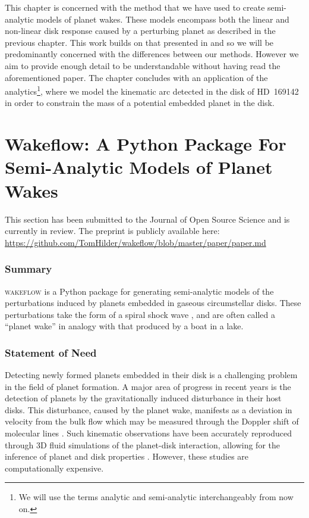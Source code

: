 \setlength{\headheight}{13.59999pt}

This chapter is concerned with the method that we have used to create semi-analytic models of planet wakes.
These models encompass both the linear and non-linear disk response caused by a perturbing planet as described in the previous chapter. 
This work builds on that presented in \citet{bollati2021} and so we will be predominantly concerned with the differences between our methods.
However we aim to provide enough detail to be understandable without having read the aforementioned paper.
The chapter concludes with an application of the analytics\footnote{We will use the terms analytic and semi-analytic interchangeably from now on.}, where we model the kinematic arc detected in the disk of HD~169142 in order to constrain the mass of a potential embedded planet in the disk.

\section{Wakeflow: A Python Package For Semi-Analytic Models of Planet Wakes} \label{sec:JOSS}

This section has been submitted to the Journal of Open Source Science and is currently in review. The preprint is publicly available here: \url{https://github.com/TomHilder/wakeflow/blob/master/paper/paper.md}

\subsubsection{Summary}

\textsc{wakeflow} is a Python package for generating semi-analytic models of the perturbations induced by planets embedded in gaseous circumstellar disks. 
These perturbations take the form of a spiral shock wave \citep{ogilvie2002}, and are often called a ``planet wake'' in analogy with that produced by a boat in a lake.

\subsubsection{Statement of Need}

Detecting newly formed planets embedded in their disk is a challenging problem in the field of planet formation. 
A major area of progress in recent years is the detection of planets by the gravitationally induced disturbance in their host disks. 
This disturbance, caused by the planet wake, manifests as a deviation in velocity from the bulk flow which may be measured through the Doppler shift of molecular lines \citep[eg.][]{perez2015, pinte2018a}. 
Such kinematic observations have been accurately reproduced through 3D fluid simulations of the planet-disk interaction, allowing for the inference of planet and disk properties \citep{pinte2018a, pinte2019}. 
However, these studies are computationally expensive.

